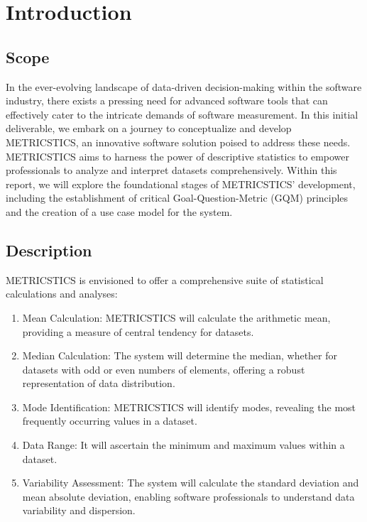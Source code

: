 \documentclass[letterpaper,12pt]{article}
\begin{document}
\newcommand{\CC}{C\nolinebreak\hspace{-.05em}\raisebox{.4ex}{\tiny\bf +}\nolinebreak\hspace{-.10em}\raisebox{.4ex}{\tiny\bf +}}
\def\CC{{C\nolinebreak[4]\hspace{-.05em}\raisebox{.4ex}{\tiny\bf ++}}}

\tableofcontents
\newpage
\section{Introduction}

\subsection{Scope}
In the ever-evolving landscape of data-driven decision-making within the software industry, there exists a pressing need for advanced software tools that can effectively cater to the intricate demands of software measurement. In this initial deliverable, we embark on a journey to conceptualize and develop METRICSTICS, an innovative software solution poised to address these needs. METRICSTICS aims to harness the power of descriptive statistics to empower professionals to analyze and interpret datasets comprehensively. Within this report, we will explore the foundational stages of METRICSTICS' development, including the establishment of critical Goal-Question-Metric (GQM) principles and the creation of a use case model for the system.

\subsection{Description}
METRICSTICS is envisioned to offer a comprehensive suite of statistical calculations and analyses:
\begin{enumerate}
\item Mean Calculation: METRICSTICS will calculate the arithmetic mean, providing a measure of central tendency for datasets.

\item Median Calculation: The system will determine the median, whether for datasets with odd or even numbers of elements, offering a robust representation of data distribution.

\item Mode Identification: METRICSTICS will identify modes, revealing the most frequently occurring values in a dataset.

\item Data Range: It will ascertain the minimum and maximum values within a dataset.

\item Variability Assessment: The system will calculate the standard deviation and mean absolute deviation, enabling software professionals to understand data variability and dispersion.
\end{enumerate}
\end{document}
